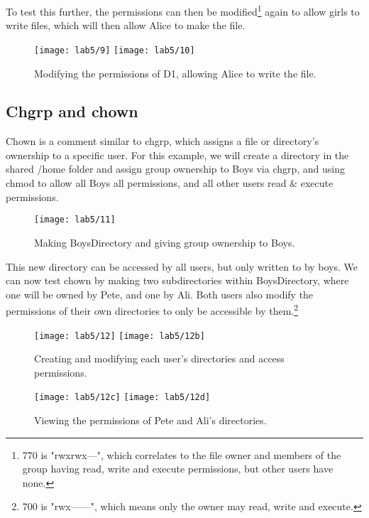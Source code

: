 To test this further, the permissions can then be modified\footnote{770 is "rwxrwx---", which
correlates to the file owner and members of the group having read, write and execute permissions, but other users have none.}
again to allow girls to write files, which will then allow Alice to make the file.

\begin{figure}[H]
    \centering
    \texttt{[image: lab5/9]}
    \texttt{[image: lab5/10]}
    \caption{Modifying the permissions of D1, allowing Alice to write the file.}
    \label{fig:girlsWriteD1Success}
\end{figure}

\pagebreak

\subsection{Chgrp and chown}\label{subsec:using-chown}
Chown is a comment similar to chgrp, which assigns a file or directory's ownership
to a specific user.
For this example, we will create a directory in the shared /home folder and assign group ownership
to Boys via chgrp, and using chmod to allow all Boys all permissions, and all other users
read \& execute permissions.

\begin{figure}[H]
    \centering
    \texttt{[image: lab5/11]}
    \caption{Making BoysDirectory and giving group ownership to Boys.}
    \label{fig:BoysDirectory}
\end{figure}

This new directory can be accessed by all users, but only written to by boys.
We can now test chown by making two subdirectories within BoysDirectory, where one will be owned
by Pete, and one by Ali.
Both users also modify the permissions of their own directories to only be accessible
by them.\footnote{700 is "rwx------", which means only the owner may read,
write and execute.}

\begin{figure}[H]
    \centering
    \texttt{[image: lab5/12]}
    \texttt{[image: lab5/12b]}
    \caption{Creating and modifying each user's directories and access permissions.}
    \label{fig:PeteAliDir}
\end{figure}

\begin{figure}[H]
    \centering
    \texttt{[image: lab5/12c]}
    \texttt{[image: lab5/12d]}
    \caption{Viewing the permissions of Pete and Ali's directories.}
    \label{fig:AliDirPerms}
\end{figure}

